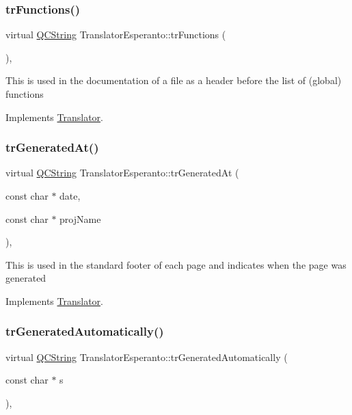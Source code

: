 \subsubsection{\texorpdfstring{trFunctions()}{trFunctions()}}
{\footnotesize\ttfamily virtual \mbox{\hyperlink{class_q_c_string}{Q\+C\+String}} Translator\+Esperanto\+::tr\+Functions (\begin{DoxyParamCaption}{ }\end{DoxyParamCaption})\hspace{0.3cm}{\ttfamily [inline]}, {\ttfamily [virtual]}}

This is used in the documentation of a file as a header before the list of (global) functions 

Implements \mbox{\hyperlink{class_translator}{Translator}}.

\mbox{\label{class_translator_esperanto_ad017ad481cf81f64a9a2731b7e528b4f}} 
\subsubsection{\texorpdfstring{trGeneratedAt()}{trGeneratedAt()}}
{\footnotesize\ttfamily virtual \mbox{\hyperlink{class_q_c_string}{Q\+C\+String}} Translator\+Esperanto\+::tr\+Generated\+At (\begin{DoxyParamCaption}\item[{const char $\ast$}]{date,  }\item[{const char $\ast$}]{proj\+Name }\end{DoxyParamCaption})\hspace{0.3cm}{\ttfamily [inline]}, {\ttfamily [virtual]}}

This is used in the standard footer of each page and indicates when the page was generated 

Implements \mbox{\hyperlink{class_translator}{Translator}}.

\mbox{\label{class_translator_esperanto_a13c6109cf2758399a2c8113e9a20bd6f}} 
\subsubsection{\texorpdfstring{trGeneratedAutomatically()}{trGeneratedAutomatically()}}
{\footnotesize\ttfamily virtual \mbox{\hyperlink{class_q_c_string}{Q\+C\+String}} Translator\+Esperanto\+::tr\+Generated\+Automatically (\begin{DoxyParamCaption}\item[{const char $\ast$}]{s }\end{DoxyParamCaption})\hspace{0.3cm}{\ttfamily [inline]}, {\ttfamily [virtual]}}

